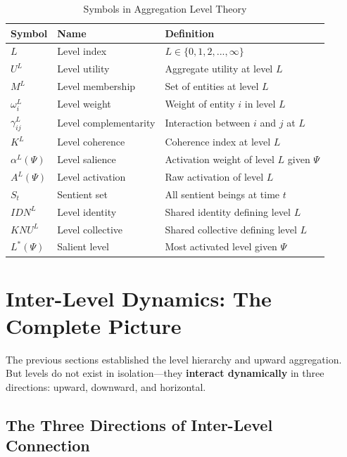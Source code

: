 \begin{table}[htbp]
\centering
\caption{Symbols in Aggregation Level Theory}
\label{tab:aaa-symbols}
\renewcommand{\arraystretch}{1.3}
\begin{tabular}{@{}lll@{}}
\toprule
\textbf{Symbol} & \textbf{Name} & \textbf{Definition} \\
\midrule
$L$ & Level index & $L \in \{0, 1, 2, ..., \infty\}$ \\
$U^L$ & Level utility & Aggregate utility at level $L$ \\
$M^L$ & Level membership & Set of entities at level $L$ \\
$\omega^L_i$ & Level weight & Weight of entity $i$ in level $L$ \\
$\gamma^L_{ij}$ & Level complementarity & Interaction between $i$ and $j$ at $L$ \\
$K^L$ & Level coherence & Coherence index at level $L$ \\
$\alpha^L(\Psi)$ & Level salience & Activation weight of level $L$ given $\Psi$ \\
$A^L(\Psi)$ & Level activation & Raw activation of level $L$ \\
$S_t$ & Sentient set & All sentient beings at time $t$ \\
$IDN^L$ & Level identity & Shared identity defining level $L$ \\
$KNU^L$ & Level collective & Shared collective defining level $L$ \\
$L^*(\Psi)$ & Salient level & Most activated level given $\Psi$ \\
\bottomrule
\end{tabular}
\end{table}

\section{Inter-Level Dynamics: The Complete Picture}
\label{sec:aaa-inter-level}

The previous sections established the level hierarchy and upward aggregation.
But levels do not exist in isolation---they \textbf{interact dynamically} in
three directions: upward, downward, and horizontal.

\subsection{The Three Directions of Inter-Level Connection}


